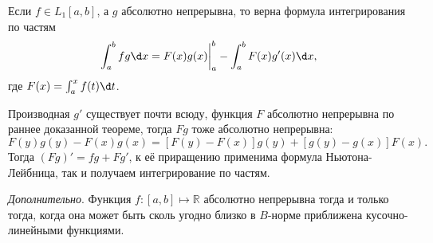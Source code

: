 

\begin{to_con}
    Если $f \in L_1 [a, b]$, а $g$ абсолютно непрерывна, то верна формула интегрирования по частям
    \begin{equation*}
        \int_a^b f g \d x = F(x) g(x) \bigg|_a^b
        - \int_a^b F(x) g'(x) \d x,
    \end{equation*}
    где $F(x) = \int_a^x f(t) \d t$.
\end{to_con}

\begin{uproof}
    Производная $g'$ существует почти всюду, функция $F$ абсолютно непрерывна по раннее доказанной теореме, тогда $Fg$ тоже абсолютно непрерывна:
    \begin{equation*}
        F(y) g(y) - F(x) g(x) = \left[
            F(y) - F(x)
        \right] g(y) + 
        \left[
            g(y) - g(x)
        \right] F(x).
    \end{equation*}
    Тогда $(Fg)' = fg + F g'$, к её приращению применима формула Ньютона-Лейбница, так и получаем интегрирование по частям. 
\end{uproof}

\textit{Дополнительно}. 
    Функция $f \colon [a, b] \mapsto \mathbb{R}$ абсолютно непрерывна тогда и только тогда, когда она может быть сколь угодно близко в $B$-норме приближена кусочно-линейными функциями.


